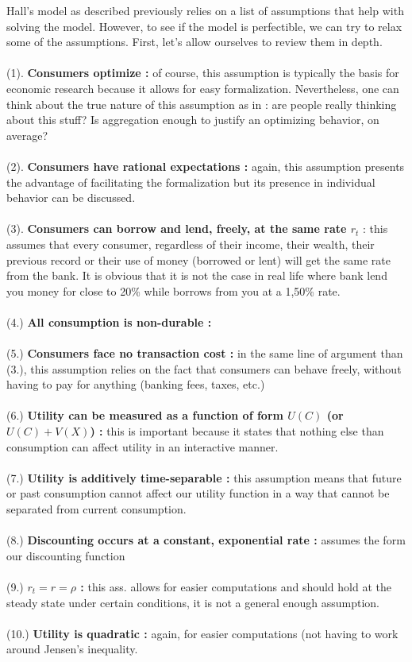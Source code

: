 \documentclass[12pt]{report}
\begin{document}
Hall's model as described previously relies on a list of assumptions that help with solving the model. However, to see if the model is perfectible, we can try to relax some of the assumptions. First, let's allow ourselves to review them in depth. \\ \\
(1). \textbf{Consumers optimize :} of course, this assumption is typically the basis for economic research because it allows for easy formalization. Nevertheless, one can think about the true nature of this assumption as in : are people really thinking about this stuff? Is aggregation enough to justify an optimizing behavior, on average? \\ \\
(2). \textbf{Consumers have rational expectations :} again, this assumption presents the advantage of facilitating the formalization but its presence in individual behavior can be discussed.\\ \\
(3). \textbf{Consumers can borrow and lend, freely, at the same rate $r_t$} : this assumes that every consumer, regardless of their income, their wealth, their previous record or their use of money (borrowed or lent) will get the same rate from the bank. It is obvious that it is not the case in real life where bank lend you money for close to 20\% while borrows from you at a 1,50\% rate. \\ \\
(4.) \textbf{All consumption is non-durable :} \\ \\
(5.) \textbf{Consumers face no transaction cost :} in the same line of argument than (3.), this assumption relies on the fact that consumers can behave freely, without having to pay for anything (banking fees, taxes, etc.) \\ \\
(6.) \textbf{Utility can be measured as a function of form $U(C)$ (or $U(C) + V(X)$) :} this is important because it states that nothing else than consumption can affect utility in an interactive manner. \\ \\
(7.) \textbf{Utility is additively time-separable :} this assumption means that future or past consumption cannot affect our utility function in a way that cannot be separated from current consumption. \\ \\
(8.) \textbf{Discounting occurs at a constant, exponential rate :} assumes the form our discounting function \\ \\
(9.) \textbf{$r_t = r = \rho$ :} this ass. allows for easier computations and should hold at the steady state under certain conditions, it is not a general enough assumption. \\ \\
(10.) \textbf{Utility is quadratic :} again, for easier computations (not having to work around Jensen's inequality.
\end{document}

